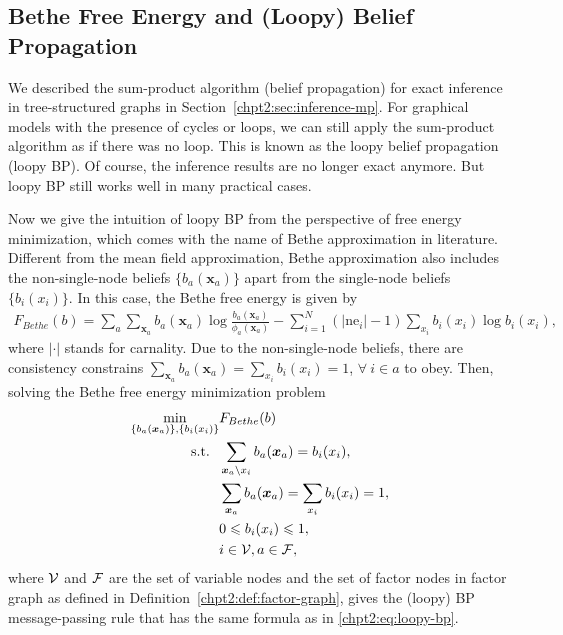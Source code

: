 \subsection{Bethe Free Energy and (Loopy) Belief Propagation}

We described the sum-product algorithm (belief propagation) for exact inference in tree-structured graphs in Section~\ref{chpt2:sec:inference-mp}. For graphical models with the presence of cycles or loops, we can still apply the sum-product algorithm as if there was no loop. This is known as the loopy belief propagation (loopy BP). Of course, the inference results are no longer exact anymore. But loopy BP still works well in many practical cases.

Now we give the intuition of loopy BP from the perspective of free energy minimization, which comes with the name of Bethe approximation in literature.
Different from the mean field approximation, Bethe approximation also includes the non-single-node beliefs $\{b_{a}(\bm{x}_{a})\}$ apart from the single-node beliefs $\{b_i(x_i)\}$\cite{yedidia2003understanding}. In this case, the Bethe free energy is given by
\begin{align}\label{chpt2:bethe-free-energy}
  F_{Bethe}(b) = \sum_{a} \sum_{\bm{x}_{a}}
  b_{a}(\bm{x}_{a})\log{\frac{b_{a}(\bm{x}_{a})}{\phi_{a}(\bm{x}_{a})}
  } -  \sum_{i=1}^{N} (|\mathrm{ne}_i| - 1) \sum_{x_i} b_i(x_i) \log{b_i(x_i)},
\end{align}
where $|\cdot|$ stands for carnality.
Due to the  non-single-node beliefs, there are consistency constrains $\sum_{\bm{x}_{a}} b_{a}(\bm{x}_{a}) = \sum_{ x_i} b_i({x}_i) =1$, $\forall~ i \in a$ to obey. Then, solving the Bethe free energy minimization problem
\begin{align}
  \min_{\{b_{a}(\bm{x}_{a})\}, \{b_i(x_i)\}}& F_{Bethe}(b) \nonumber \\
  \mathrm{s.t.}~~ & \sum_{\bm{x}_{a} \backslash x_i} b_{a}(\bm{x}_{a})  =
                    b_i(x_i), \nonumber \\
                                                      & \sum_{\bm{x}_{a}} b_{a}(\bm{x}_{a}) = \sum_{ x_i} b_i({x}_i) =1,
                                                        \nonumber \\
                                                      &  0 \leqslant b_i(x_i) \leqslant 1,  \nonumber \\
                                                      & i \in \mathcal{V} , a \in \mathcal{F},
\end{align}
where $\mathcal{V}$ and $\mathcal{F}$ are the set of variable nodes and the set of
factor nodes in factor graph as defined in
Definition~\ref{chpt2:def:factor-graph}, gives the (loopy) BP message-passing rule that has the same formula as in \eqref{chpt2:eq:loopy-bp}.

